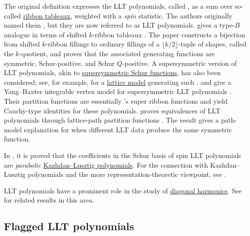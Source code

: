 The original definition expresses the LLT polynomials, called
\label{spinLLTPolynomial}, as a sum over
so-called \hyperref[borderStripTableauxDefinition]{ribbon tableaux}, weighted
with a \emph{spin} statistic.
The authors originally named them , but they are
now referred to as LLT polynomials.
 gives a type-$B$ analogue in terms of
shifted $k$-ribbon tableaux \cite{Oguz2020}.  The paper constructs a
bijection from shifted $k$-ribbon fillings to ordinary fillings of a
$\lfloor k/2\rfloor$-tuple of shapes, called the $k$-quotient, and proves
that the associated generating functions are symmetric, Schur-positive, and
Schur $Q$-positive.
A supersymmetric version of LLT polynomials, akin to
\hyperref[hookSchur]{supersymmetric Schur functions}, has also been
considered; see, for example, \cite{CurranFrechetteYostWolffZhangZhang2021x}
for a \hyperref[latticeModel]{lattice model} generating such
\label{supersymmetricLLTPolynomial}.
 and  give a Yang--Baxter integrable
vertex model for supersymmetric LLT polynomials \cite{GitlinKeating2023}.
Their partition functions are essentially 's super ribbon
functions and yield Cauchy-type identities for these polynomials.
 proves equivalences of LLT polynomials through
lattice-path partition functions \cite{Keating2025LLTx}.  The result gives a
path-model explanation for when different LLT data produce the same symmetric
function.

In \cite{LeclercThibon2000}, it is proved that the coefficients in the Schur
basis of spin LLT polynomials are \emph{parabolic}
\hyperref[kazhdanLusztigPolynomials]{Kazhdan--Lusztig polynomials}.
For the connection with Kazhdan--Lusztig polynomials and the more
representation-theoretic viewpoint, see \cite{LaniniRam2019}.

LLT polynomials have a prominent role in the study of
\hyperref[diagonalHarmonics]{diagonal harmonics}.
See \cite{BlasiakHaimanMorsePunSeelinger2021x} for related results in this
area.


\subsection[flaggedLLT]{Flagged LLT polynomials}

